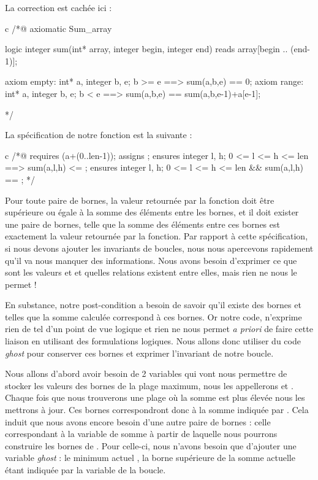 La correction est cachée ici :



\begin{Spoiler}
\begin{CodeBlock}{c}
/*@
  axiomatic Sum_array{
    logic integer sum(int* array, integer begin, integer end) reads array[begin .. (end-1)];
   
    axiom empty: 
      \forall int* a, integer b, e; b >= e ==> sum(a,b,e) == 0;
    axiom range:
      \forall int* a, integer b, e; b < e ==> sum(a,b,e) == sum(a,b,e-1)+a[e-1];
  }
*/
\end{CodeBlock}
\end{Spoiler}


La spécification de notre fonction est la suivante :



\begin{CodeBlock}{c}
/*@ 
  requires \valid(a+(0..len-1));
  assigns \nothing;
  ensures \forall integer l, h;  0 <= l <= h <= len ==> sum(a,l,h) <= \result;
  ensures \exists integer l, h;  0 <= l <= h <= len &&  sum(a,l,h) == \result;
*/
\end{CodeBlock}



Pour toute paire de bornes, la valeur retournée par la fonction doit être 
supérieure ou égale à la somme des éléments entre les bornes, et il doit exister 
une paire de bornes, telle que la somme des éléments entre ces bornes est 
exactement la valeur retournée par la fonction. Par rapport à cette spécification,
si nous devons ajouter les invariants de boucles, nous nous apercevons rapidement 
qu'il va nous manquer des informations. Nous avons besoin d'exprimer ce que sont
les valeurs  et  et quelles relations existent entre elles,
mais rien ne nous le permet !



En substance, notre post-condition a besoin de savoir qu'il existe des 
bornes  et  telles que la somme calculée correspond à ces bornes. 
Or notre code, n'exprime rien de tel d'un point de vue logique et rien ne nous 
permet \textit{a priori} de faire cette liaison en utilisant des formulations logiques.
Nous allons donc utiliser du code \textit{ghost} pour conserver ces bornes et exprimer 
l'invariant de notre boucle.



Nous allons d'abord avoir besoin de 2 variables qui vont nous permettre de stocker
les valeurs des bornes de la plage maximum, nous les appellerons  
et . Chaque fois que nous trouverons une plage où la somme est plus 
élevée nous les mettrons à jour. Ces bornes correspondront donc à la somme indiquée
par . Cela induit que nous avons encore besoin d'une autre paire de 
bornes : celle correspondant à la variable de somme  à partir de laquelle 
nous pourrons construire les bornes de . Pour celle-ci, nous n'avons 
besoin que d'ajouter une variable \textit{ghost} : le minimum actuel , la 
borne supérieure de la somme actuelle étant indiquée par la variable  de la 
boucle.



